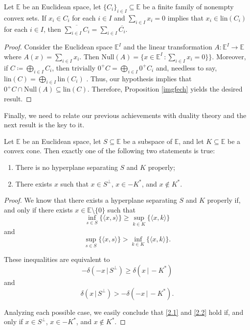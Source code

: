 \documentclass[a4paper]{article}
\begin{document}
\begin{corollary}\label{somafechada}
  Let \(\mathbb{E}\) be an Euclidean space, let \(\{C_i\}_{i\in I}\subseteq\mathbb{E}\) be a finite
  family of nonempty convex sets. If \(x_i\in C_i\) for each \(i\in I\) and \(\sum_{i\in
    I}x_i=0\) implies that \(x_i\in\text{lin}(C_i)\) for each \(i\in I\), then
  \(\overline{\sum_{i\in I}C_i}=\sum_{i\in I}\overline{C_i}\).
\end{corollary}
\begin{proof}
  Consider the Euclidean space \(\mathbb{E}^I\) and the linear transformation
  \(A\colon \mathbb{E}^I\to\mathbb{E}\) where \(A(x)=\sum_{i\in I}x_i\). Then
  \(\text{Null}(A)=\{x\in\mathbb{E}^I\,\colon \sum_{i\in I}x_i=0\}\}\). Moreover,
  if \(C\coloneqq \bigoplus_{i\in I}C_i\), then trivially \(0^+C=\bigoplus_{i\in
    I}0^+C_i\) and, needless to say, \(\text{lin}(C)=\bigoplus_{i\in
    I}\text{lin}(C_i)\) . Thus, our hypothesis implies that
  \(0^+C\cap\text{Null}(A)\subseteq\text{lin}(C)\). Therefore, Proposition
  \ref{imgfech} yields the desired result.   
\end{proof}


Finally, we need to relate our previous achievements with duality theory
and the next result is the key to it.

\begin{lemma}\label{requisitocondicoes}
Let $\mathbb{E}$ be an Euclidean space, let $S\subseteq\mathbb{E}$ be a subspace
of $\mathbb{E}$, and let \(K\subseteq\mathbb{E}\) be a convex cone. Then exactly one of the following two
statements is true:
\begin{enumerate}[label=(\roman*)]
\item There is no hyperplane separating \(S\) and \(K\) properly;
\item There exists \(x\) such that \(x\in S^\bot\), \(x\in -K^\ast\), and
  \(x\not\in K^\ast\). 
\end{enumerate}
\end{lemma}
\begin{proof}
We know that there exists a hyperplane separating \(S\) and
\(K\) properly if, and only if there exists $x\in\mathbb{E}\setminus\{0\}$
such that $$\inf_{s\in S}\{\langle x,s\rangle\}\geq\sup_{k\in K}\{\langle x,k\rangle\}$$
and $$\sup_{s\in S}\{\langle x,s\rangle\}>\inf_{k\in K}\{\langle x,k\rangle\}.$$

These inequalities are equivalent to
 \begin{equation}\label{2.1}
-\delta(-x\,\vert\, S^\bot)\geq\delta(x\,\vert\,-K^\ast)
\end{equation}
and
\begin{equation}\label{2.2}
  \delta(x\,\vert\, S^\bot)>-\delta(-x\,\vert\, -K^\ast).
  \end{equation}

Analyzing each possible case, we easily conclude that \eqref{2.1} and \eqref{2.2} hold
if, and only if \(x\in S^\bot\), \(x\in -K^\ast\), and \(x\not\in K^\ast\).   
\end{proof}
\end{document}
